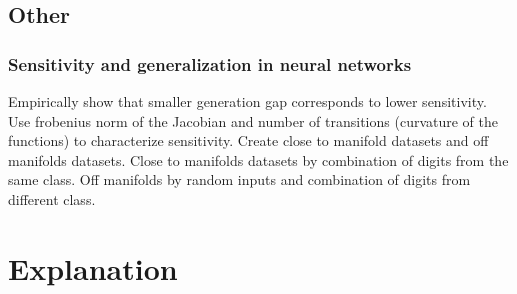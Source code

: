 \documentclass[10pt,a4paper]{article}
\begin{document}
\subsection{Other}
\subsubsection{Sensitivity and generalization in neural networks\cite{novak2018sensitivity}}
Empirically show that smaller generation gap corresponds to lower sensitivity. Use frobenius norm of the Jacobian and number of transitions (curvature of the functions) to characterize sensitivity. Create close to manifold datasets and off manifolds datasets. Close to manifolds datasets by combination of digits from the same class. Off manifolds by random inputs and combination of digits from different class.
\section{Explanation}



\end{document}
